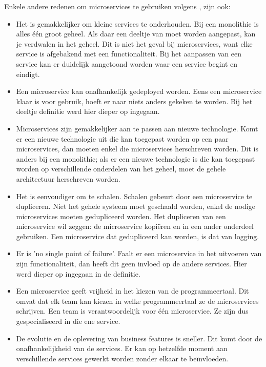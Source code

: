 Enkele andere redenen om microservices te gebruiken volgens \textcite{Koukia2018}, zijn ook:
\begin{itemize}
	\item Het is gemakkelijker om kleine services te onderhouden. Bij een monolithic is alles één groot geheel. Als daar een deeltje van moet worden aangepast, kan je verdwalen in het geheel. Dit is niet het geval bij microservices, want elke service is afgebakend met een functionaliteit. Bij het aanpassen van een service kan er duidelijk aangetoond worden waar een service begint en eindigt. 
	\item Een microservice kan onafhankelijk gedeployed worden. Eens een microservice klaar is voor gebruik, hoeft er naar niets anders gekeken te worden. Bij het deeltje definitie  werd hier dieper op ingegaan.
	\item Microservices zijn gemakkelijker aan te passen aan nieuwe  technologie. Komt er een nieuwe  technologie uit die kan toegepast worden op een paar microservices, dan moeten enkel die microservices herschreven worden. Dit is anders bij een monolithic; als er een nieuwe  technologie is die kan toegepast worden op verschillende onderdelen van het geheel, moet de gehele architectuur herschreven worden.
	\item Het is eenvoudiger om te schalen. Schalen gebeurt door een microservice te dupliceren. Niet het gehele systeem moet geschaald worden, enkel de nodige microservices moeten gedupliceerd worden. Het dupliceren van een microservice wil zeggen: de microservice kopiëren en in een ander onderdeel gebruiken. Een microservice dat gedupliceerd kan worden, is dat van logging. 
	\item Er is 'no single point of failure'. Faalt er een microservice in het uitvoeren van zijn functionaliteit, dan heeft dit geen invloed op de andere services. Hier werd dieper op ingegaan in de definitie.
	\item Een microservice geeft vrijheid in het kiezen van de programmeertaal. Dit omvat dat elk team kan kiezen in  welke programmeertaal ze de microservices schrijven. Een team is verantwoordelijk voor één microservice. Ze zijn dus gespecialiseerd in die ene service. 
	\item De evolutie en de oplevering van business features is sneller. Dit komt door de onafhankelijkheid van de services. Er kan op hetzelfde moment aan verschillende services gewerkt worden zonder elkaar te beïnvloeden.
\end{itemize}



